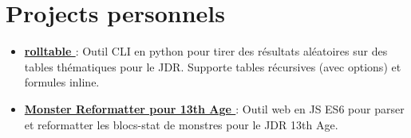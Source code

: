 \documentclass[11pt, a4paper]{moderncv}
\begin{document}
\section{Projects personnels}

\begin{itemize}
  \item \textbf{\href{https://github.com/freohr/rolltable)}{rolltable }}: Outil CLI en python pour tirer des résultats aléatoires sur des tables thématiques pour le JDR. Supporte tables récursives (avec options) et formules inline.
  \item \textbf{\href{https://github.com/freohr/13a-monster-reformatter}{Monster Reformatter pour 13th Age }}: Outil web en JS ES6 pour parser et reformatter les blocs-stat de monstres pour le JDR 13th Age.
\end{itemize}
\end{document}
